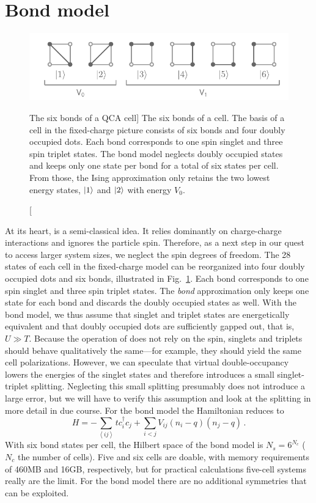 \section{Bond model}

%
\begin{figure}
  \center
  \includegraphics{bond}
  \caption
  [The six bonds of a QCA cell]
  {
  The six bonds of a  cell. The basis of a  cell in the
  fixed-charge picture consists of six bonds and four doubly occupied dots. Each
  bond corresponds to one spin singlet and three spin triplet states. The bond
  model neglects doubly occupied states and keeps only one state per bond for a
  total of six states per cell. From those, the Ising approximation only retains
  the two lowest energy states, $\left|1\right>$ and $\left|2\right>$ with energy $V_0$.
  }
  \label{fig:bond}
\end{figure}
%
At its heart,  is a semi-classical idea. It relies dominantly on
charge-charge interactions and ignores the particle spin. Therefore, as a next
step in our quest to access larger system sizes, we neglect the spin degrees of
freedom. The 28 states of each cell in the fixed-charge model can be reorganized
into four doubly occupied dots and six bonds, illustrated in
Fig.~\ref{fig:bond}. Each bond corresponds to one spin singlet and three spin
triplet states. The \emph{bond} approximation only keeps one state for each bond
and discards the doubly occupied states as well. With the bond model, we thus
assume that singlet and triplet states are energetically equivalent and that
doubly occupied dots are sufficiently gapped out, that is, $U \gg T$. Because
the operation of  does not rely on the spin, singlets and triplets
should behave qualitatively the same---for example, they should yield the same
cell polarizations. However, we can speculate that virtual double-occupancy
lowers the energies of the singlet states and therefore introduces a small
singlet-triplet splitting. Neglecting this small splitting presumably does not
introduce a large error, but we will have to verify this assumption and look at
the splitting in more detail in due course. For the bond model the 
Hamiltonian reduces to
%
\begin{equation}
  \label{eq:H_bond}
  H = - \sum_{\left<ij\right>} t c_i^{\dagger} c_j
      + \sum_{i<j} V_{ij} \left( n_i - q \right) \left( n_j - q \right) \, .
\end{equation}
%
With six bond states per cell, the Hilbert space of the bond model is $N_s =
6^{N_c}$ ($N_c$ the number of cells). Five and six cells are doable, with memory
requirements of 460MB and 16GB, respectively, but for practical calculations
five-cell systems really are the limit. For the bond model there are no
additional symmetries that can be exploited.


